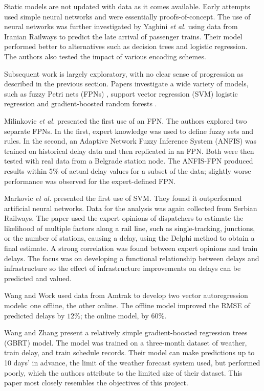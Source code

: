 \documentclass[12pt,a4paper]{article}
\begin{document}
Static models are not updated with data as it comes available. Early attempts used simple neural networks \cite{peters_et_al_2005} and were essentially proofs-of-concept. The use of neural networks was further investigated by Yaghini \textit{et al.} \cite{yaghini_et_al_2013} using data from Iranian Railways to predict the late arrival of passenger trains. Their model performed better to alternatives such as decision trees and logistic regression. The authors also tested the impact of various encoding schemes. 

Subsequent work is largely exploratory, with no clear sense of progression as described in the previous section. Papers investigate a wide variety of models, such as fuzzy Petri nets (FPNs) \cite{milinkovic_et_al_2013}, support vector regression (SVM) \cite{markovic_et_al_2015} logistic regression \cite{wang_work_2015} and gradient-boosted random forests \cite{wang_zhang_2015}.

Milinkovic \textit{et al.} \cite{milinkovic_et_al_2013} presented the first use of an FPN. The authors explored two separate FPNs. In the first, expert knowledge was used to define fuzzy sets and rules. In the second, an Adaptive Network Fuzzy Inference System (ANFIS) was trained on historical delay data and then replicated in an FPN. Both were then tested with real data from a Belgrade station node. The ANFIS-FPN produced results within 5\% of actual delay values for a subset of the data; slightly worse performance was observed for the expert-defined FPN.

Markovic \textit{et al.} \cite{markovic_et_al_2015} presented the first use of SVM. They found it outperformed artificial neural networks. Data for the analysis was again collected from Serbian Railways. The paper used the expert opinions of dispatchers to estimate the likelihood of multiple factors along a rail line, such as single-tracking, junctions, or the number of stations, causing a delay, using the Delphi method to obtain a final estimate. A strong correlation was found between expert opinions and train delays. The focus was on developing a functional relationship between delays and infrastructure so the effect of infrastructure improvements on delays can be predicted and valued.  

Wang and Work \cite{wang_work_2015} used data from Amtrak to develop two vector autoregression models: one offline, the other online. The offline model improved the RMSE of predicted delays by $12\%$; the online model, by $60\%$.

Wang and Zhang \cite{wang_zhang_2019} present a relatively simple gradient-boosted regression trees (GBRT) model. The model was trained on a three-month dataset of weather, train delay, and train schedule records. Their model can make predictions up to 10 days’ in advance, the limit of the weather forecast system used, but performed poorly, which the authors attribute to the limited size of their dataset. This paper most closely resembles the objectives of this project. 
\end{document}
